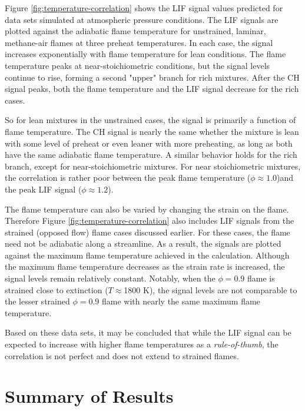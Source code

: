 Figure \ref{fig:temperature-correlation} shows the LIF signal values predicted for data sets simulated at atmospheric pressure conditions.
The LIF signals are plotted against the adiabatic flame temperature for unstrained, laminar, methane-air flames at three preheat temperatures.
In each case, the signal increases exponentially with flame temperature for lean conditions.
The flame temperature peaks at near-stoichiometric conditions, but the signal levels continue to rise, forming a second "upper" branch for rich mixtures.
After the CH signal peaks, both the flame temperature and the LIF signal decrease for the rich cases.



So for lean mixtures in the unstrained cases, the signal is primarily a function of flame temperature.
The CH signal is nearly the same whether the mixture is lean with some level of preheat or even leaner with more preheating, as long as both have the same adiabatic flame temperature. 
A similar behavior holds for the rich branch, except for near-stoichiometric mixtures.
For near stoichiometric mixtures, the correlation is rather poor between the peak flame temperature (\(\phi\approx 1.0\))and the peak LIF signal (\(\phi\approx 1.2\)).

The flame temperature can also be varied by changing the strain on the flame.
Therefore Figure \ref{fig:temperature-correlation} also includes LIF signals from the strained (opposed flow) flame cases discussed earlier.
For these cases, the flame need not be adiabatic along a streamline.
As a result, the signals are plotted against the maximum flame temperature achieved in the calculation.
Although the maximum flame temperature decreases as the strain rate is increased, the signal levels remain relatively constant.
Notably, when the \(\phi = 0.9\) flame is strained close to extinction (\(T\approx\)1800 K), the signal levels are not comparable to the lesser strained \(\phi = 0.9\) flame with nearly the same maximum flame temperature.

Based on these data sets, it may be concluded that while the LIF signal can be expected to increase with higher flame temperatures as a \emph{rule-of-thumb}, the correlation is not perfect and does not extend to strained flames. 


\section{Summary of Results}

